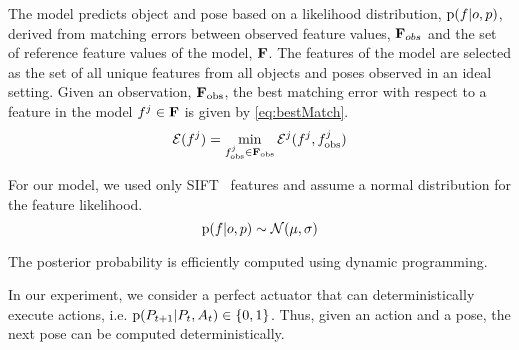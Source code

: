            The model predicts object and pose based on a likelihood distribution, $\text{p}(f|o,p)$, derived from matching errors between observed feature values, $\mathbf{F}_{obs}$ and the set of reference feature values of the model, $\mathbf{F}$. The features of the model are selected as the set of all unique features from all objects and poses observed in an ideal setting. Given an observation, $\mathbf{F}_{\text{obs}}$, the best matching error with respect to a feature in the model $f^j \in \mathbf{F}$ is given by \eqref{eq:bestMatch}.
            \begin{equation}
                \label{eq:bestMatch}
                \cursive{E}(f^j) = \min_{f^j_{\text{obs}} \in \set{F}_{\text{obs}}}\cursive{E}^j(f^j,f^j_{\text{obs}})
            \end{equation}
            

            For our model, we used only SIFT~\cite{lowe2004distinctive} features and assume a normal distribution for the feature likelihood.   
            \begin{equation}
                \text{p}(f|o,p) \sim \mathcal{N}(\mu,\sigma)
            \end{equation}

            The posterior probability is efficiently computed using dynamic programming.
            

            In our experiment, we consider a perfect actuator that can deterministically execute actions, i.e. $\text{p}(P_{t+1}|P_t,A_t) \in \{ 0 , 1 \}$. Thus, given an action and a pose, the next pose can be computed deterministically. 

